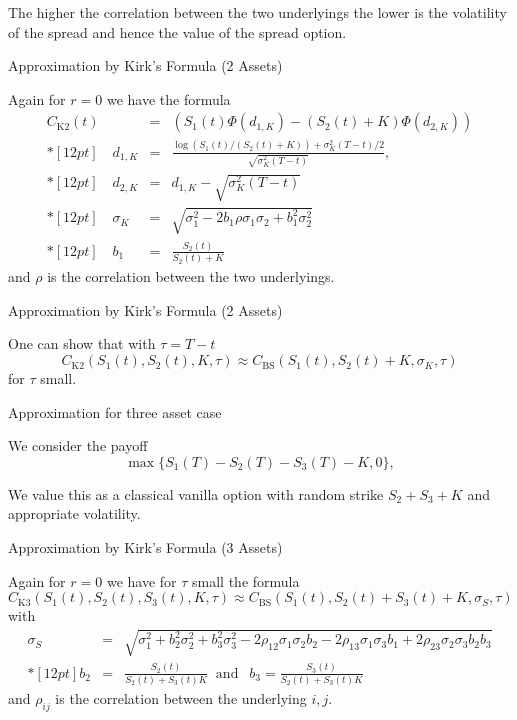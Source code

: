 \vspace{-1cm}

	The higher the correlation between the two underlyings the lower is the volatility of the spread and hence the value of the spread option.


{Approximation by Kirk's Formula (2 Assets)}

Again for $r=0$ we have the formula $$\begin{array}{lll}
 C_{\mbox{K2}}(t) & = & (S_1(t)\Phi(d_{1,K})-(S_2(t)+K)\Phi(d_{2,K}))
 \\*[12pt]
 \quad d_{1,K} & = & \frac{\log(S_1(t)/(S_2(t)+K))+\sigma_K^{2}(T-t)/2}{\sqrt{\sigma_K^{2}(T-t)}},\\*[12pt]
  \quad d_{2,K} &=&d_{1,K}-\sqrt{\sigma_K^{2}(T-t)}
 \\*[12pt]
 \quad \sigma_K & = & \sqrt{\sigma_1^2-2b_1\rho\sigma_1\sigma_2+b_1^2\sigma_2^2}\\*[12pt]
 \quad b_1 &=& \frac{S_2(t)}{S_2(t)+K}
\end{array}$$
and $\rho$ is the correlation between the two underlyings.

{Approximation by Kirk's Formula (2 Assets)}

One can show that with $\tau=T-t$
$$
 C_{\mbox{K2}}(S_1(t), S_2(t), K, \tau) \approx
 C_{\mbox{BS}}(S_1(t), S_2(t)+K, \sigma_K, \tau)
 $$
  for  $\tau$ small.

{Approximation for three asset case}


	We consider the payoff
\begin{equation}
\max\{S_1(T) - S_2(T)- S_3(T)-K, 0\},
\label{Three_asset_value}
\end{equation}

	We value this as a classical vanilla option with random strike $S_2+S_3+K$ and appropriate volatility.


{Approximation by Kirk's Formula (3 Assets)}

Again for $r=0$ we have for  $\tau$ small the formula
{\small
\begin{equation}
 C_{\mbox{K3}}(S_1(t), S_2(t), S_3(t), K, \tau) \approx
 C_{\mbox{BS}}(S_1(t), S_2(t)+S_3(t)+K, \sigma_S, \tau)
\label{kirk3}
\end{equation}
with
 $$
 \begin{array}{lll}
 \sigma_S & = & \sqrt{\sigma_1^2+b_2^2\sigma_2^2 +b_3^2\sigma_3^2
 - 2\rho_{12}\sigma_1\sigma_2b_2 - 2\rho_{13}\sigma_1\sigma_3b_1 + 2\rho_{23}\sigma_2\sigma_3b_2b_3}\\*[12pt]
 b_2 &=& \frac{S_2(t)}{S_2(t)+S_3(t) K}
 \;\;\mbox{and}  \;\;\
  b_3 = \frac{S_3(t)}{S_2(t)+S_3(t) K}
\end{array}$$
}
and $\rho_{ij}$ is the correlation between the underlying $i,j$.

